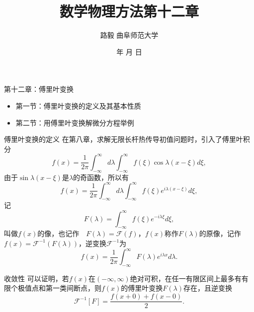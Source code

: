 \documentclass[11pt]{beamer}
\begin{document}
	\author{ 路毅 \hspace{0.3cm} 曲阜师范大学 }
	\date{\number\year 年 \number\month 月 \number\day 日}
	\title{数学物理方法第十二章}

\begin{frame}
	\maketitle
\end{frame}

\kaishu

\begin{frame}{第十二章：傅里叶变换}
\begin{itemize}
	\item 第一节：傅里叶变换的定义及其基本性质
	\vspace{1cm}
	\item 第二节：用傅里叶变换解微分方程举例
\end{itemize}
\end{frame}

\begin{frame}{傅里叶变换的定义}
在第八章，求解无限长杆热传导初值问题时，引入了傅里叶积分
\begin{equation}
f(x) = \frac{1}{2\pi} \int^\infty_{-\infty} d \lambda \int^\infty_{-\infty} f(\xi) \cos \lambda(x-\xi) d\xi,
\end{equation}
由于$\sin \lambda (x - \xi)$是$\lambda$的奇函数，所以有
\begin{equation}
f(x) = \frac{1}{2\pi} \int^\infty_{-\infty} d \lambda \int^\infty_{-\infty} f(\xi) e^{ i \lambda(x-\xi) } d\xi,
\end{equation}
记
\begin{equation}
F(\lambda) = \int^\infty_{-\infty} f(\xi) e^{-i\lambda \xi} d\xi,
\end{equation}
叫做$f(x)$的像，也记作　$ F(\lambda) = \mathscr{F}(f)$，$f(x)$称作$F(\lambda)$的原像，记作$f(x) = \mathscr{F}^{-1}(F(\lambda))$，逆变换$\mathscr{F}^{-1}$为
\begin{equation}
f(x) = \frac{1}{2\pi}\int^\infty_{-\infty} F(\lambda) e^{i\lambda x} d \lambda.
\end{equation}
\end{frame}


\begin{frame}{收敛性}
可以证明，若$f(x)$在$(-\infty,\infty)$绝对可积，在任一有限区间上最多有有限个极值点和第一类间断点，则$f(x)$的傅里叶变换$F(\lambda)$存在，且逆变换
\begin{equation}
\mathscr{F}^{-1}[F] = \frac{f(x+0)+f(x-0)}{2}.
\end{equation}

\end{frame}
\end{document}
